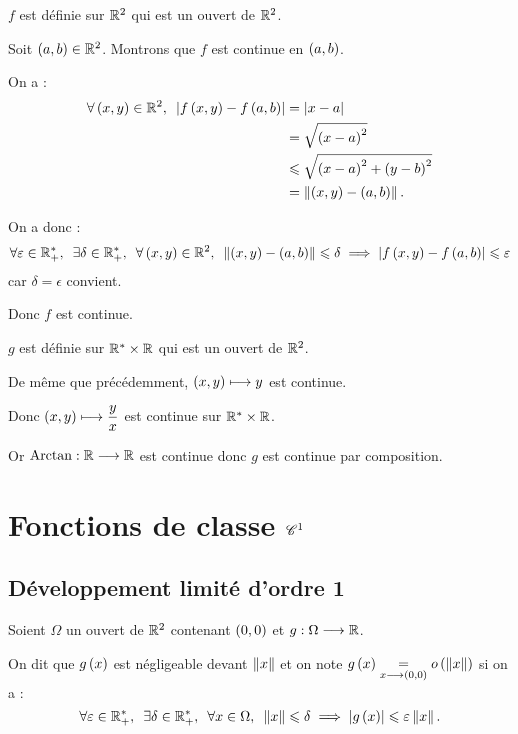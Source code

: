 \begin{corr}
\(f\) est définie sur \(\mathbb{R}^2\) qui est un ouvert de \(\mathbb{R}^2\).

Soit \(\left(a,b\right)\in\mathbb{R}^2\). Montrons que \(f\) est continue en \(\left(a,b\right)\).

On a : \[\begin{aligned}
\quantifs{\forall\paren{x,y}\in\R^2}\abs{f\paren{x,y}-f\paren{a,b}}&=\abs{x-a} \\
&=\sqrt{\paren{x-a}^2} \\
&\leq\sqrt{\paren{x-a}^2+\paren{y-b}^2} \\
&=\norme{\paren{x,y}-\paren{a,b}}.
\end{aligned}\]

On a donc : \[\quantifs{\forall\epsilon\in\Rps;\exists\delta\in\Rps;\forall\paren{x,y}\in\R^2}\norme{\paren{x,y}-\paren{a,b}}\leq\delta\imp\abs{f\paren{x,y}-f\paren{a,b}}\leq\epsilon\] car \(\delta=\epsilon\) convient.

Donc \(f\) est continue.

\(g\) est définie sur \(\mathbb{R}^*\times\mathbb{R}\) qui est un ouvert de \(\mathbb{R}^2\).

De même que précédemment, \(\left(x,y\right)\longmapsto y\) est continue.

Donc \(\left(x,y\right)\longmapsto\dfrac{y}{x}\) est continue sur \(\mathbb{R}^*\times\mathbb{R}\).

Or \(\operatorname{Arctan}:\mathbb{R}\longrightarrow\mathbb{R}\) est continue donc \(g\) est continue par composition.
\end{corr}

\section{Fonctions de classe \(\mathscr{C}^{1}\)}

\subsection{Développement limité d'ordre 1}

\begin{nota}
Soient \(\Omega\) un ouvert de \(\mathbb{R}^2\) contenant \(\left(0,0\right)\) et \(g:\Omega\longrightarrow\mathbb{R}\).

On dit que \(g\left(x\right)\) est négligeable devant \(\left\|x\right\|\) et on note \(g\left(x\right)\underset{x\longrightarrow\left(0,0\right)}{=}o\left(\left\|x\right\|\right)\) si on a : \[\quantifs{\forall\epsilon\in\Rps;\exists\delta\in\Rps;\forall x\in\Omega}\norme{x}\leq\delta\imp\abs{g\paren{x}}\leq\epsilon\norme{x}.\]
\end{nota}

